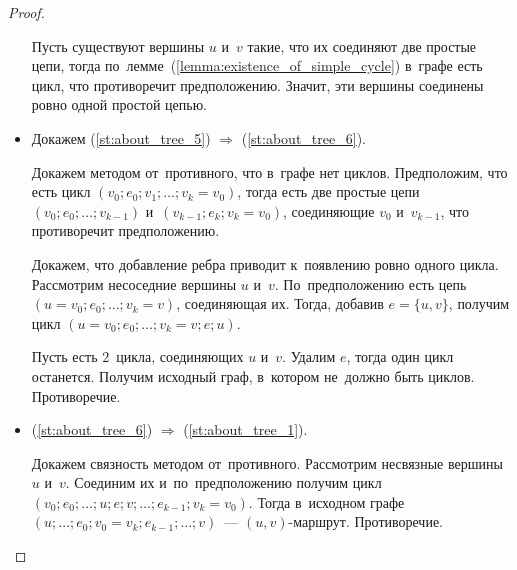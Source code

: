 \begin{proof}
\begin{itemize}
	Пусть существуют вершины $u$ и~$v$ такие, что их соединяют две простые цепи, тогда по~лемме~(\ref{lemma:existence_of_simple_cycle}) в~графе есть цикл, что противоречит предположению.
	Значит, эти вершины соединены ровно одной простой цепью.
	
	\item Докажем (\ref{st:about_tree_5}) $\Rightarrow$ (\ref{st:about_tree_6}).
	
	Докажем методом от~противного, что в~графе нет циклов.
	Предположим, что есть цикл $(v_0; e_0; v_1; \allowbreak \ldots; \allowbreak v_k = v_0)$, тогда есть две простые цепи $(v_0; e_0; \ldots; v_{k-1})$ и~$(v_{k-1}; e_k; v_k = v_0)$, соединяющие $v_0$ и~$v_{k-1}$, что противоречит предположению.
	
	Докажем, что добавление ребра приводит к~появлению ровно одного цикла.
	Рассмотрим несоседние вершины $u$ и~$v$.
	По~предположению есть цепь $(u = v_0; e_0; \ldots; v_k = v)$, соединяющая их.
	Тогда, добавив $e = \{ u, v \}$, получим цикл $(u = v_0; e_0; \ldots; v_k = v; e; u)$.
	
	Пусть есть $2$~цикла, соединяющих $u$ и~$v$.
	Удалим $e$, тогда один цикл останется.
	Получим исходный граф, в~котором не~должно быть циклов.
	Противоречие.
	
	\item (\ref{st:about_tree_6}) $\Rightarrow$ (\ref{st:about_tree_1}).
	
	Докажем связность методом от~противного.
	Рассмотрим несвязные вершины $u$ и~$v$.
	Соединим их и~по~предположению получим цикл $(v_0; e_0; \ldots; u; e; v; \ldots; e_{k-1}; v_k = v_0)$.
	Тогда в~исходном графе $(u; \ldots; e_0; v_0 = v_k; e_{k-1}; \ldots; v)$~--- $(u, v)$-маршрут.
	Противоречие.
\end{itemize}
\end{proof}